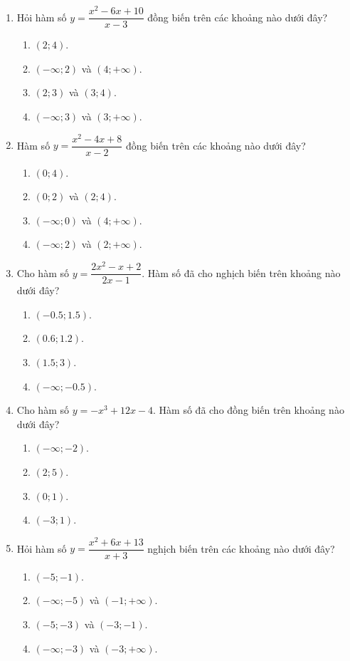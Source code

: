 \documentclass[12pt]{article}
\begin{document}
\begin{enumerate}[label=\textbf{Câu \arabic*.}]
		\item Hỏi hàm số $y = \dfrac{x^2 - 6x + 10}{x - 3}$ đồng biến trên các khoảng nào dưới đây?
		\begin{enumerate}[label=\textbf{\Alph*.}]
			\item $(2; 4)$.
			\item $(-\infty; 2)$ và $(4; +\infty)$.
			\item $(2; 3)$ và $(3; 4)$.
			\item $(-\infty; 3)$ và $(3; +\infty)$.
		\end{enumerate}
		
		\item Hàm số $y = \dfrac{x^2 - 4x + 8}{x - 2}$ đồng biến trên các khoảng nào dưới đây?
		\begin{enumerate}[label=\textbf{\Alph*.}]
			\item $(0; 4)$.
			\item $(0; 2)$ và $(2; 4)$.
			\item $(-\infty; 0)$ và $(4; +\infty)$.
			\item $(-\infty; 2)$ và $(2; +\infty)$.
		\end{enumerate}
		
		\item Cho hàm số $y = \dfrac{2x^2 - x + 2}{2x - 1}$. Hàm số đã cho nghịch biến trên khoảng nào dưới đây?
		\begin{enumerate}[label=\textbf{\Alph*.}]
			\item $(-0.5; 1.5)$.
			\item $(0.6; 1.2)$.
			\item $(1.5; 3)$.
			\item $(-\infty; -0.5)$.
		\end{enumerate}
		
		\item Cho hàm số $y = -x^3 + 12x - 4$. Hàm số đã cho đồng biến trên khoảng nào dưới đây?
		\begin{enumerate}[label=\textbf{\Alph*.}]
			\item $(-\infty; -2)$.
			\item $(2; 5)$.
			\item $(0; 1)$.
			\item $(-3; 1)$.
		\end{enumerate}
		
		\item Hỏi hàm số $y = \dfrac{x^2 + 6x + 13}{x + 3}$ nghịch biến trên các khoảng nào dưới đây?
		\begin{enumerate}[label=\textbf{\Alph*.}]
			\item $(-5; -1)$.
			\item $(-\infty; -5)$ và $(-1; +\infty)$.
			\item $(-5; -3)$ và $(-3; -1)$.
			\item $(-\infty; -3)$ và $(-3; +\infty)$.
		\end{enumerate}
		

\end{enumerate}
\end{document}

